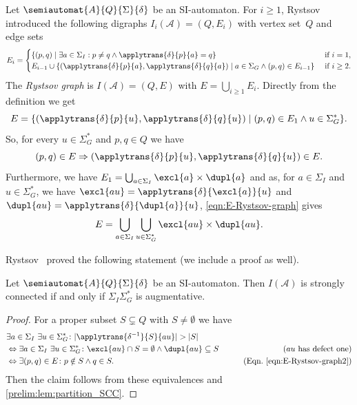 
\label{def:Rystsovgraph}
Let $\semiautomat{A}{Q}{\Sigma}{\delta}$ be an SI-automaton. 
For $i \ge 1$, Rystsov~\cite{Rystsov2000} introduced the following digraphs $I_i(\mathcal A) = (Q, E_i)$
with vertex set~$Q$ and edge sets
\[
E_i = 
\begin{cases}
	\{ (p, q) \mid \exists a \in \Sigma_I : p \ne q \land \applytrans{\delta}{p}{a} = q\} & \text{ if } i = 1, \\
	E_{i-1} \cup \{ (\applytrans{\delta}{p}{a}, \applytrans{\delta}{q}{a}) \mid a \in \Sigma_G \land (p,q) \in E_{i-1} \} & \text{ if } i \ge 2.
\end{cases}
\]
The \emph{Rystsov graph} is $I(\mathcal A) = (Q, E)$ with $E = \bigcup_{i \ge 1} E_i$.
Directly from the definition we get
\begin{equation}\label{eqn:E-Rystsov-graph} 
E = \{ (\applytrans{\delta}{p}{u}, \applytrans{\delta}{q}{u}) \mid (p,q) \in E_1 \land u \in \Sigma_G^* \}.
\end{equation}
So, for every $u \in \Sigma_G^*$ and $p,q \in Q$
we have
\begin{equation}\label{eqn:acts_automorphism}
	(p,q) \in E \Rightarrow (\applytrans{\delta}{p}{u}, \applytrans{\delta}{q}{u}) \in E.
\end{equation}
Furthermore, we have $E_1 = \bigcup_{a \in \Sigma_I} \excl{a} \times \dupl{a}$
and as, for $a \in \Sigma_I$ and $u \in \Sigma_G^*$,
we have $\excl{au} = \applytrans{\delta}{\excl{a}}{u}$ and $\dupl{au} = \applytrans{\delta}{\dupl{a}}{u}$,
\cref{eqn:E-Rystsov-graph} gives
\begin{equation}\label{eqn:E-Rystsov-graph2} 
	E = \bigcup_{a \in \Sigma_I} \bigcup_{u \in \Sigma_G^*} \excl{au} \times \dupl{au}.
\end{equation}

Rystsov~\cite{Rystsov2000} proved the following statement (we include a proof as well).

\begin{theorem} \label{sync_max:thm:IA-SCC-augmentative}
	Let $\semiautomat{A}{Q}{\Sigma}{\delta}$ be an SI-automaton.
	Then $I(\mathcal A)$ is strongly connected if and only if $\Sigma_I\Sigma_G^*$ is augmentative.
\end{theorem}
\begin{proof}
	For a proper subset $S \subsetneq Q$ with $S \ne \emptyset$ we have
	\begin{align*}
		& \exists a \in \Sigma_I \ \exists u \in \Sigma_G^* \colon |\applytrans{\delta^{-1}}{S}{au}| > |S| \\ 		
		& \Leftrightarrow  \exists a \in \Sigma_I \ \exists u \in \Sigma_G^* \colon \excl{au} \cap S = \emptyset \land \dupl{au} \subseteq S & \tag{$au$ has defect one} \\
		& \Leftrightarrow  \exists (p,q) \in E \colon p \notin S \land q \in S.  & \tag{Eqn.~\eqref{eqn:E-Rystsov-graph2}} 
	\end{align*}
	Then the claim follows from these equivalences and \cref{prelim:lem:partition_SCC}.	
\end{proof}

